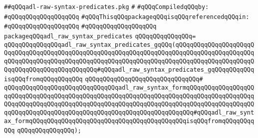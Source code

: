 \label{src/lib/compiler/back/low/tools/arch/adl-raw-syntax-predicates.pkg}
\verb|##qQQqadl-raw-syntax-predicates.pkg|\newline
\verb|#|\newline
\newline
\verb|#qQQqCompiledqQQqby:|\newline
\verb|#qQQqqQQqqQQqqQQqqQQq|\newline
\newline
\newline
\verb|#qQQqThisqQQqpackageqQQqisqQQqreferencedqQQqin:|\newline
\verb|#qQQqqQQqqQQqqQQqqQQq|\newline
\verb|#qQQqqQQqqQQqqQQqqQQq|\newline
\newline
\verb|packageqQQqadl_raw_syntax_predicates|\newline
\verb|qQQqqQQqqQQqqQQq=|\newline
\verb|qQQqqQQqqQQqqQQqadl_raw_syntax_predicates_gqQQq(qQQqqQQqqQQqqQQqqQQqqQQqqQQqqQQqqQQqqQQqqQQqqQQqqQQqqQQqqQQqqQQqqQQqqQQqqQQqqQQqqQQqqQQqqQQqqQQqqQQqqQQqqQQqqQQqqQQqqQQqqQQqqQQqqQQqqQQqqQQqqQQqqQQqqQQqqQQqqQQqqQQqqQQqqQQqqQQqqQQqqQQqqQQq#qQQqadl_raw_syntax_predicates_gqQQqqQQqqQQqisqQQqfromqQQqqQQqqQQq|\newline
\verb|qQQqqQQqqQQqqQQqqQQqqQQqqQQqqQQq#|\newline
\verb|qQQqqQQqqQQqqQQqqQQqqQQqqQQqqQQqadl_raw_syntax_formqQQqqQQqqQQqqQQqqQQqqQQqqQQqqQQqqQQqqQQqqQQqqQQqqQQqqQQqqQQqqQQqqQQqqQQqqQQqqQQqqQQqqQQqqQQqqQQqqQQqqQQqqQQqqQQqqQQqqQQqqQQqqQQqqQQqqQQqqQQqqQQqqQQqqQQqqQQqqQQqqQQqqQQqqQQqqQQqqQQqqQQqqQQqqQQqqQQqqQQqqQQqqQQqqQQq#qQQqadl_raw_syntax_formqQQqqQQqqQQqqQQqqQQqqQQqqQQqqQQqqQQqqQQqqQQqisqQQqfromqQQqqQQqqQQq|\newline
\verb|qQQqqQQqqQQqqQQq);|\newline

